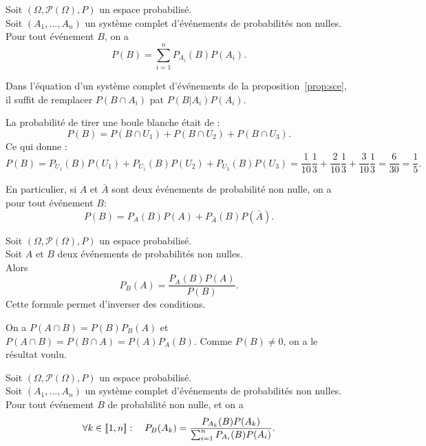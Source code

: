 \documentclass{book}
\begin{document}
\begin{Proposition}
Soit $(\Omega,\mathcal{P}(\Omega),P)$ un espace probabilisé.\\
Soit $(A_1,\ldots,A_n)$ un système complet d'événements de probabilités non nulles.\\
Pour tout événement $B$, on a
\[ P(B) = \sum_{i=1}^n P_{A_i}(B)P(A_i). \]
\end{Proposition}
\begin{Demonstration}
Dans l'équation d'un système complet d'événements  de la proposition~\ref{prop:sce}, il suffit de remplacer $P(B\cap A_i)$ pat $P(B|A_i)P(A_i).$
\end{Demonstration}
\begin{Exemple}[3 urnes]
La probabilité de tirer une boule blanche était de :
$$P(B)= P(B\cap U_1)+P(B\cap U_2)+P(B\cap U_3).$$
Ce qui donne :
$$P(B)= P_{U_1}(B)P(U_1)+P_{U_1}(B)P(U_2)+P_{U_3}(B)P(U_3)=\frac{1}{10} \frac 1 3+ \frac{2}{10} \frac 1 3 +\frac{3}{10} \frac 1 3 =\frac{6}{30} =\frac{1}{5} .$$
\end{Exemple}
\begin{Remarque}
En particulier, si  $A$ et $\bar A$ sont deux événements de probabilité non nulle, on a pour tout événement $B$:
\[ P(B) = P_A(B)P(A) + P_{\bar A}(B)P(\bar A).\]
\end{Remarque}



\begin{Proposition}
Soit $(\Omega,\mathcal{P}(\Omega),P)$ un espace probabilisé.\\
Soit $A$ et $B$ deux événements de probabilités non nulles.\\
Alors
$$ P_B(A) = \frac{ P_A(B)P(A) }{ P(B) }.$$
Cette formule permet d'inverser des conditions. 
\end{Proposition}
\begin{Demonstration}
On a $P(A\cap B)=P(B)P_B(A)$ et $P(A\cap B)=P(B\cap A)=P(A)P_A(B)$. Comme $P(B)\neq 0$, on a le résultat voulu. 
\end{Demonstration}

\begin{Proposition}
Soit $(\Omega,\mathcal{P}(\Omega),P)$ un espace probabilisé.\\
Soit $(A_1,\ldots,A_n)$ un système complet d'événements de probabilités non nulles.\\
Pour tout événement $B$ de probabilité non nulle,
et  on a
\[\forall k\in\mathopen\lbrack\!\lbrack1,n \mathclose\rbrack\!\rbrack :\quad P_B(A_k) = \frac{ P_{A_k}(B)P(A_k) }{ \sum_{i=1}^n P_{A_i}(B)P(A_i) }. \]
\end{Proposition}
\end{document}
